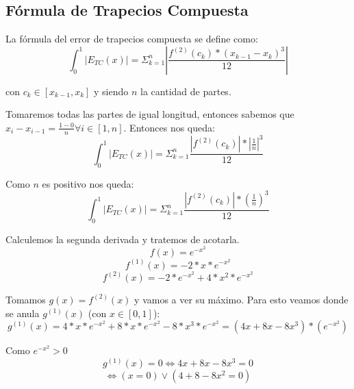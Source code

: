 \documentclass[a4paper,10pt]{article}
\begin{document}
\subsection{Fórmula de Trapecios Compuesta}
\par La fórmula del error de trapecios compuesta se define como:
\begin{equation}
	\int_0^1 \left| E_{TC}(x) \right|  = \Sigma_{k=1}^n \left| \frac{f^{(2)}(c_k)*(x_{k-1} - x_k)^3}{12}  \right|
\end{equation}
\par con $c_k \in [x_{k-1}, x_k]$ y siendo $n$ la cantidad de partes.
\par Tomaremos todas las partes de igual longitud, entonces sabemos que $x_i - x_{i-1} = \frac{1-0}{n} \forall i \in [1,n]$. Entonces nos queda:
\begin{equation}
	\int_0^1 \left| E_{TC}(x) \right| = \Sigma_{k=1}^n \frac{\left| f^{(2)}(c_k) \right| * \left| \frac{1}{n} \right|^3}{12}
\end{equation}
\par Como $n$ es positivo nos queda:
\begin{equation}
	\int_0^1 \left| E_{TC}(x) \right| = \Sigma_{k=1}^n \frac{\left| f^{(2)}(c_k) \right| * (\frac{1}{n})^3}{12}
\end{equation}
\par Calculemos la segunda derivada y tratemos de acotarla.
\begin{equation}
	f(x) = e^{-x^2}
\end{equation}
\begin{equation}
	f^{(1)}(x) = -2*x*e^{-x^2}
\end{equation}
\begin{equation}
	f^{(2)}(x) = -2*e^{-x^2} + 4*x^2*e^{-x^2}
\end{equation}
\par Tomamos $g(x) = f^{(2)}(x)$ y vamos a ver su máximo. Para esto veamos donde se anula $g^{(1)}(x)$ (con $x \in [0,1]$):
\begin{equation}
	g^{(1)}(x) = 4*x*e^{-x^2} + 8*x*e^{-x^2} - 8*x^3*e^{-x^2} = (4x + 8x -8x^3)*(e^{-x^2})
\end{equation}
\par Como $e^{-x^2} > 0$
\begin{equation}
	g^{(1)}(x) = 0 \Leftrightarrow 4x + 8x -8x^3 = 0
\end{equation}
\begin{equation}
	\Leftrightarrow (x=0) \vee (4 + 8 - 8x^2 = 0)
\end{equation}
\end{document}
